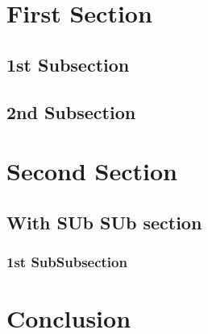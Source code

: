 \section{First Section}\cite{Dummy1}
\lipsum[1]
\subsection{1st Subsection}
\lipsum[2]
\subsection{2nd Subsection}
\lipsum[3]


\section{Second Section}
\lipsum[4]
\subsection{With SUb SUb section}
\lipsum[5]
\subsubsection{1st SubSubsection}
\lipsum[6]

\section{Conclusion}
\lipsum[7]
